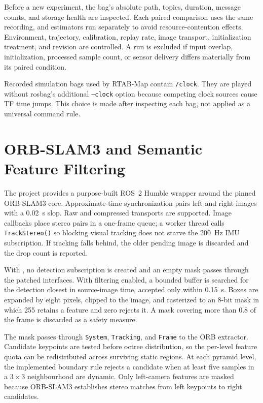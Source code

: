 Before a new experiment, the bag's absolute path, topics, duration, message
counts, and storage health are inspected. Each paired comparison uses the same
recording, and estimators run separately to avoid resource-contention effects.
Environment, trajectory, calibration, replay rate, image transport,
initialization treatment, and revision are controlled. A run is excluded if
input overlap, initialization, processed sample count, or sensor delivery differs
materially from its paired condition.

Recorded simulation bags used by RTAB-Map contain \texttt{/clock}. They are
played without rosbag's additional \texttt{--clock} option because competing
clock sources cause TF time jumps. This choice is made after inspecting each bag,
not applied as a universal command rule.

\section{ORB-SLAM3 and Semantic Feature Filtering}
\label{sec:orb-method}

The project provides a purpose-built ROS~2 Humble wrapper around the pinned
ORB-SLAM3 core. Approximate-time synchronization pairs left and right images with
a \SI{0.02}{\second} slop. Raw and compressed transports are supported. Image
callbacks place stereo pairs in a one-frame queue; a worker thread calls
\texttt{TrackStereo()} so blocking visual tracking does not starve the
\SI{200}{\hertz} IMU subscription. If tracking falls behind, the older pending
image is discarded and the drop count is reported.

With , no detection subscription is created and an empty mask
passes through the patched interfaces. With filtering enabled, a bounded buffer
is searched for the detection closest in source-image time, accepted only within
\SI{0.15}{\second}. Boxes are expanded by eight pixels, clipped to the image, and
rasterized to an 8-bit mask in which 255 retains a feature and zero rejects it. A
mask covering more than 0.8 of the frame is discarded as a safety measure.

The mask passes through \texttt{System}, \texttt{Tracking}, and \texttt{Frame} to
the ORB extractor. Candidate keypoints are tested before octree distribution, so
the per-level feature quota can be redistributed across surviving static regions.
At each pyramid level, the implemented boundary rule rejects a candidate when at
least five samples in a $3\times3$ neighbourhood are dynamic. Only left-camera
features are masked because ORB-SLAM3 establishes stereo matches from left
keypoints to right candidates.

